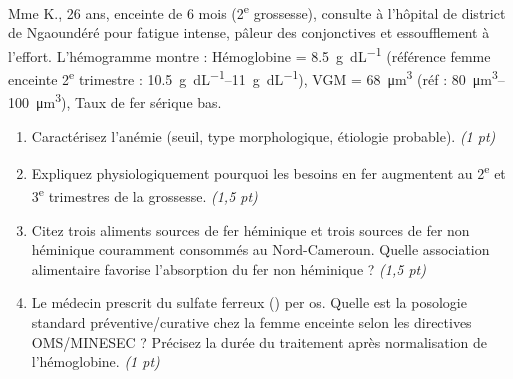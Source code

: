 \documentclass[11pt]{article}
\begin{document}
\begin{exercice}
Mme K., 26 ans, enceinte de 6 mois (2\textsuperscript{e} grossesse), consulte à l'hôpital de district de Ngaoundéré pour fatigue intense, pâleur des conjonctives et essoufflement à l'effort. L'hémogramme montre : Hémoglobine = \SI{8,5}{\gram\per\deci\liter} (référence femme enceinte 2\textsuperscript{e} trimestre : \SIrange{10,5}{11}{\gram\per\deci\liter}), VGM = \SI{68}{\cubic\micro\meter} (réf : \SIrange{80}{100}{\cubic\micro\meter}), Taux de fer sérique bas.

\begin{enumerate}
    \item Caractérisez l'anémie (seuil, type morphologique, étiologie probable). \textit{(1 pt)}
    \item Expliquez physiologiquement pourquoi les besoins en fer augmentent au 2\textsuperscript{e} et 3\textsuperscript{e} trimestres de la grossesse. \textit{(1,5 pt)}
    \item Citez trois aliments sources de fer héminique et trois sources de fer non héminique couramment consommés au Nord-Cameroun. Quelle association alimentaire favorise l'absorption du fer non héminique ? \textit{(1,5 pt)}
    \item Le médecin prescrit du sulfate ferreux () per os. Quelle est la posologie standard préventive/curative chez la femme enceinte selon les directives OMS/MINESEC ? Précisez la durée du traitement après normalisation de l'hémoglobine. \textit{(1 pt)}
\end{enumerate}
\end{exercice}
\end{document}
